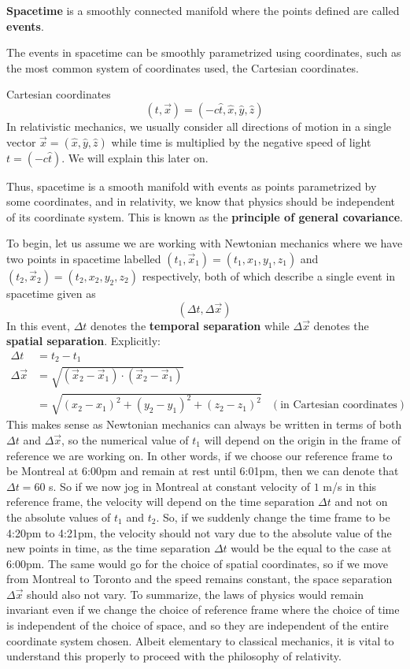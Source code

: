 \documentclass{article}
\begin{document}
 		\begin{defn}
 			\textbf{Spacetime} is a smoothly connected manifold where the points defined are called \textbf{events}.
 		\end{defn}
 		The events in spacetime can be smoothly parametrized using coordinates, such as the most common system of coordinates used, the Cartesian coordinates.
 		\begin{exmp}
 			Cartesian coordinates
 			$$ (t, \vec{x}) = (-c\hat{t}, \hat{x}, \hat{y}, \hat{z})$$
 			In relativistic mechanics, we usually consider all directions of motion in a single vector $\vec{x} = (\hat{x}, \hat{y}, \hat{z})$ while time is multiplied by the negative speed of light $t = (-c\hat{t})$. We will explain this later on.
 		\end{exmp}
 		Thus, spacetime is a smooth manifold with events as points parametrized by some coordinates, and in relativity, we know that physics should be independent of its coordinate system. This is known as the \textbf{principle of general covariance}.
 		
 		\pagebreak
 		To begin, let us assume we are working with Newtonian mechanics where we have two points in spacetime labelled $(t_1, \vec{x}_1) = (t_1, x_1, y_1, z_1)$ and $(t_2, \vec{x}_2) = (t_2, x_2, y_2, z_2)$ respectively, both of which describe a single event in spacetime given as $$(\Delta t, \Delta \vec{x})$$ 
 		In this event, $\Delta t$ denotes the \textbf{temporal separation} while $\Delta \vec{x}$ denotes the \textbf{spatial separation}. Explicitly:
 		\begin{align*}
 			\Delta t &=	t_2 - t_1\\
 			\Delta \vec{x} &= \sqrt{(\vec{x}_2 - \vec{x}_1)\cdot (\vec{x}_2 - \vec{x}_1)}\\ 
 			&= \sqrt{(x_2 - x_1)^2 + (y_2 - y_1)^2 + (z_2 - z_1)^2} & (\text{in Cartesian coordinates})
 		\end{align*}
 		This makes sense as Newtonian mechanics can always be written in terms of both $\Delta t$ and $\Delta \vec{x}$, so the numerical value of $t_1$ will depend on the origin in the frame of reference we are working on. In other words, if we choose our reference frame to be Montreal at 6:00pm and remain at rest until 6:01pm, then we can denote that $\Delta t = 60$ s. So if we now jog in Montreal at constant velocity of $1$ m/s in this reference frame, the velocity will depend on the time separation $\Delta t$ and not on the absolute values of $t_1$ and $t_2$. So, if we suddenly change the time frame to be 4:20pm to 4:21pm, the velocity should not vary due to the absolute value of the new points in time, as the time separation $\Delta t$ would be the equal to the case at 6:00pm. The same would go for the choice of spatial coordinates, so if we move from Montreal to Toronto and the speed remains constant, the space separation $\Delta \vec{x}$ should also not vary. To summarize, the laws of physics would remain invariant even if we change the choice of reference frame where the choice of time is independent of the choice of space, and so they are independent of the entire coordinate system chosen. Albeit elementary to classical mechanics, it is vital to understand this properly to proceed with the philosophy of relativity.
 		
\end{document}
